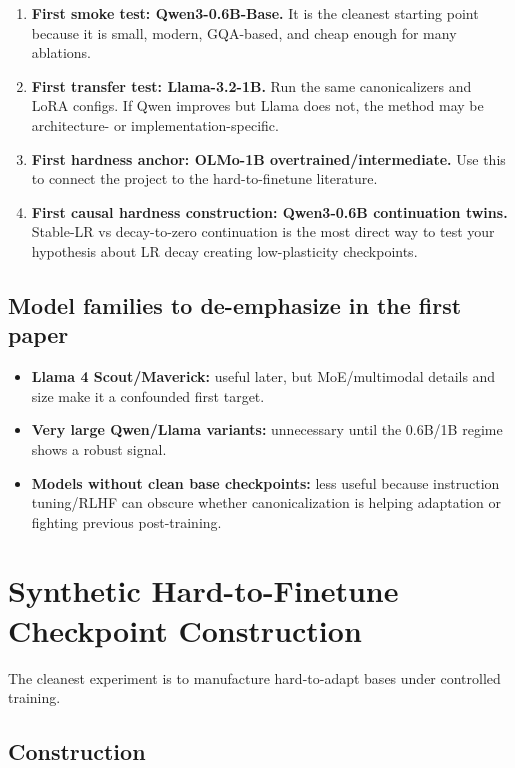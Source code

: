 \documentclass[11pt]{article}
\begin{document}
\begin{enumerate}[leftmargin=*]
    \item \textbf{First smoke test: Qwen3-0.6B-Base.} It is the cleanest starting point because it is small, modern, GQA-based, and cheap enough for many ablations.
    \item \textbf{First transfer test: Llama-3.2-1B.} Run the same canonicalizers and LoRA configs. If Qwen improves but Llama does not, the method may be architecture- or implementation-specific.
    \item \textbf{First hardness anchor: OLMo-1B overtrained/intermediate.} Use this to connect the project to the hard-to-finetune literature.
    \item \textbf{First causal hardness construction: Qwen3-0.6B continuation twins.} Stable-LR vs decay-to-zero continuation is the most direct way to test your hypothesis about LR decay creating low-plasticity checkpoints.
\end{enumerate}

\subsection{Model families to de-emphasize in the first paper}

\begin{itemize}[leftmargin=*]
    \item \textbf{Llama 4 Scout/Maverick:} useful later, but MoE/multimodal details and size make it a confounded first target.
    \item \textbf{Very large Qwen/Llama variants:} unnecessary until the 0.6B/1B regime shows a robust signal.
    \item \textbf{Models without clean base checkpoints:} less useful because instruction tuning/RLHF can obscure whether canonicalization is helping adaptation or fighting previous post-training.
\end{itemize}

\section{Synthetic Hard-to-Finetune Checkpoint Construction}

The cleanest experiment is to manufacture hard-to-adapt bases under controlled training.

\subsection{Construction}
\end{document}
